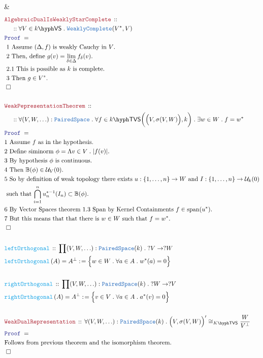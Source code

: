 \documentclass[12pt]{scrartcl}
\newcommand{\TYPE}[1]{\textcolor{NavyBlue}{\mathtt{#1}}}
\newcommand{\FUNC}[1]{\textcolor{Cerulean}{\mathtt{#1}}}
\newcommand{\LOGIC}[1]{\textcolor{Blue}{\mathtt{#1}}}
\newcommand{\THM}[1]{\textcolor{Maroon}{\mathtt{#1}}}
\renewcommand{\.}{\; . \;}
\newcommand{\de}{: \kern 0.1pc =}
\newcommand{\Act}[1]{\left( #1 \right)}
\newcommand{\Theorem}[2]{& \THM{#1} \, :: \, #2 \\ & \Proof = \\ }
\newcommand{\DeclareFunc}[2]{& \FUNC{#1} \, :: \, #2 \\}
\newcommand{\DefineNamedFunc}[4]{&  \FUNC{#1}\Act{#2} = #3 \de #4 \\}
\newcommand{\NewLine}{\\ & \kern 1pc}
\newcommand{\Page}[1]{ \begin{align*} #1 \end{align*}   }
\newcommand{\Explain}[1]{& \text{#1.} \\}
\newcommand{\ExplainFurther}[1]{& \text{#1} \\}
\newcommand{\QED}{\; \square}
\newcommand{\EndProof}{& \QED \\}
\newcommand{\Proof}{\LOGIC{Proof} \; }
\renewcommand{\U}{\mathcal{U}}
\newcommand{\Cell}{\mathbb{B}}
\DeclareMathOperator{\Span}{span} %
\newcommand{\VS}[1]{#1\hyph\mathsf{VS}} %
\newcommand{\PS}{\TYPE{PairedSpace}}
\newcommand{\TVS}[1]{{#1}\hyph\mathsf{TVS}}
\begin{document}
{	\EndProof
}\Page{
	\Theorem{AlgebraicDualIsWeaklyStarComplete}
	{
		\NewLine ::		
		\forall V \in \VS{k} \.
		\TYPE{WeaklyComplete}(V^*,V)
	}
	\Explain{ 1 Assume $(\Delta,f)$ is weakly Cauchy in $V$}
	\Explain{ 2 Then, define $g(v) = \lim_{\delta \in \Delta} f_\delta(v)$}
	\Explain{ 2.1 This is possible as $k$ is complete}
	\Explain{ 3 Then $g \in V^*$}
	\EndProof
	\\
	\Theorem{WeakPepresentationTheorem}
	{
		\NewLine::		
		\forall (V,W,\ldots) : \PS  \.
		\forall f \in \TVS{k}\bigg(\Big(V,\sigma(V,W)\Big), k \bigg) \. \exists w \in W \. f = w^* 
	}
	\Explain{1 Assume $f$ as in the hypothesis}
	\Explain{2 Define siminorm $\phi = \Lambda v \in V \. |f(v)|$}
	\Explain{3 By hypothesis $\phi$ is continuous}
	\Explain{4 Then $\Cell(\phi) \in \U_V(0)$}
	\ExplainFurther{5 So by definition of weak topology 
		there exists $u : \{1,\ldots,n\} \to W$  and $I : \{1,\ldots,n\} \to \U_k(0)$}
	\Explain{ such that 
		$\bigcap^n_{i=1} u^{*-1}_n(I_n) \subset \Cell(\phi)$}
	\Explain{6 By Vector Spaces theorem 1.3 Span by Kernel Containments $f \in \Span(u^*)$}
	\Explain{7 But this means that that there is $w \in W$ such that $f = w^*$}
	\EndProof
	\\
	\DeclareFunc{leftOrthogonal}
	{
		\prod (V,W,\ldots) : \PS(k) \. ?V \to ?W
	}
	\DefineNamedFunc{leftOrthogonal}{A}{A^\bot}{\Big\{ w \in W \. \forall a \in A \. w^*(a) = 0\Big\}}
	\\
	\DeclareFunc{rightOrthogonal}
	{
		\prod (V,W,\ldots) : \PS(k) \. ?W \to ?V
	}
	\DefineNamedFunc{rightOrthogonal}{A}{A^\bot}{\Big\{ v \in V \. \forall a \in A \. a^*(v) = 0\Big\}}
	\\
	\Theorem{WeakDualRepresentation}
	{
		\forall (V,W,\ldots) : \PS(k) \. 
		\Big(V,\sigma(V,W)\Big)' \cong_{\TVS{K}} \frac{W}{V^\bot}
	}
	\Explain{Follows from previous theorem and the isomorphism theorem}
	\EndProof
}
\newpage
\end{document}
